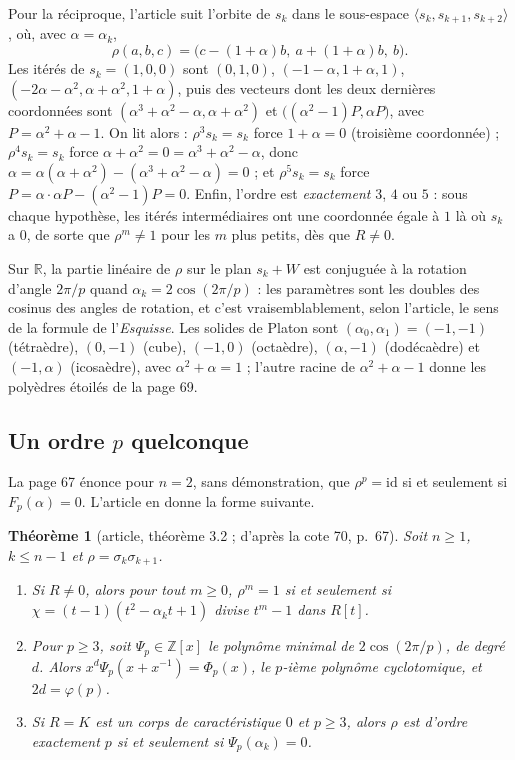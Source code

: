\documentclass[11pt,a4paper]{amsart}
\theoremstyle{definition}
\theoremstyle{plain}
\newtheorem{theoreme}{Théorème}
\theoremstyle{remark}
\newcommand{\Z}{\mathbb Z}
\newcommand{\R}{\mathbb R}
\newcommand{\id}{\mathrm{id}}
\begin{document}
Pour la réciproque, l'article suit l'orbite de $s_k$ dans le sous-espace $\langle s_k, s_{k+1}, s_{k+2}\rangle$, où, avec $\alpha = \alpha_k$,
\[
\rho(a,b,c) = \bigl(c - (1+\alpha)b,\ a + (1+\alpha)b,\ b\bigr).
\]
Les itérés de $s_k = (1,0,0)$ sont $(0,1,0)$, $(-1-\alpha, 1+\alpha, 1)$, $(-2\alpha - \alpha^2, \alpha + \alpha^2, 1 + \alpha)$, puis des vecteurs dont les deux dernières coordonnées sont $(\alpha^3 + \alpha^2 - \alpha, \alpha + \alpha^2)$ et $\bigl((\alpha^2 - 1)P, \alpha P\bigr)$, avec $P = \alpha^2 + \alpha - 1$. On lit alors : $\rho^3s_k = s_k$ force $1 + \alpha = 0$ (troisième coordonnée) ; $\rho^4s_k = s_k$ force $\alpha + \alpha^2 = 0 = \alpha^3 + \alpha^2 - \alpha$, donc $\alpha = \alpha(\alpha + \alpha^2) - (\alpha^3 + \alpha^2 - \alpha) = 0$ ; et $\rho^5s_k = s_k$ force $P = \alpha\cdot\alpha P - (\alpha^2 - 1)P = 0$. Enfin, l'ordre est \emph{exactement} $3$, $4$ ou $5$ : sous chaque hypothèse, les itérés intermédiaires ont une coordonnée égale à $1$ là où $s_k$ a $0$, de sorte que $\rho^m \ne 1$ pour les $m$ plus petits, dès que $R \ne 0$.

Sur $\R$, la partie linéaire de $\rho$ sur le plan $s_k + W$ est conjuguée à la rotation d'angle $2\pi/p$ quand $\alpha_k = 2\cos(2\pi/p)$ : les paramètres sont les doubles des cosinus des angles de rotation, et c'est vraisemblablement, selon l'article, le sens de la formule de l'\emph{Esquisse}. Les solides de Platon sont $(\alpha_0, \alpha_1) = (-1,-1)$ (tétraèdre), $(0,-1)$ (cube), $(-1,0)$ (octaèdre), $(\alpha,-1)$ (dodécaèdre) et $(-1,\alpha)$ (icosaèdre), avec $\alpha^2 + \alpha = 1$ ; l'autre racine de $\alpha^2 + \alpha - 1$ donne les polyèdres étoilés de la page 69.

\subsection{Un ordre \texorpdfstring{$p$}{p} quelconque}

La page 67 énonce pour $n = 2$, sans démonstration, que $\rho^p = \id$ si et seulement si $F_p(\alpha) = 0$. L'article en donne la forme suivante.

\begin{theoreme}[article, théorème 3.2 ; d'après la cote 70, p.~67]
Soit $n \ge 1$, $k \le n-1$ et $\rho = \sigma_k\sigma_{k+1}$.
\begin{enumerate}
\item Si $R \ne 0$, alors pour tout $m \ge 0$, $\rho^m = 1$ si et seulement si $\chi = (t-1)(t^2 - \alpha_kt + 1)$ divise $t^m - 1$ dans $R[t]$.
\item Pour $p \ge 3$, soit $\Psi_p \in \Z[x]$ le polynôme minimal de $2\cos(2\pi/p)$, de degré $d$. Alors $x^d\Psi_p(x + x^{-1}) = \Phi_p(x)$, le $p$-ième polynôme cyclotomique, et $2d = \varphi(p)$.
\item Si $R = K$ est un corps de caractéristique $0$ et $p \ge 3$, alors $\rho$ est d'ordre exactement $p$ si et seulement si $\Psi_p(\alpha_k) = 0$.
\end{enumerate}
\end{theoreme}
\end{document}
